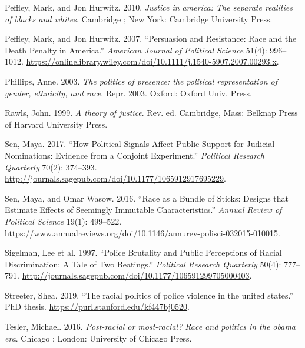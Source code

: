 \documentclass[
  12pt,
]{article}
\newlength{\cslhangindent}
\newlength{\cslentryspacingunit} %
\newenvironment{CSLReferences}[2] %
 {%
  \setlength{\parindent}{0pt}
  \ifodd #1
  \let\oldpar\par
  \def\par{\hangindent=\cslhangindent\oldpar}
  \fi
  \setlength{\parskip}{#2\cslentryspacingunit}
 }%
 {}
\begin{document}
\begin{CSLReferences}{1}{0}
\leavevmode{}%
Peffley, Mark, and Jon Hurwitz. 2010. \emph{Justice in america: The
separate realities of blacks and whites}. Cambridge ; New York:
Cambridge University Press.

\leavevmode{}%
Peffley, Mark, and Jon Hurwitz. 2007. {``Persuasion and Resistance: Race
and the Death Penalty in America.''} \emph{American Journal of Political
Science} 51(4): 996--1012.
\url{https://onlinelibrary.wiley.com/doi/10.1111/j.1540-5907.2007.00293.x}.

\leavevmode{}%
Phillips, Anne. 2003. \emph{The politics of presence: the political
representation of gender, ethnicity, and race}. Repr. 2003. Oxford:
Oxford Univ. Press.

\leavevmode{}%
Rawls, John. 1999. \emph{A theory of justice}. Rev. ed. Cambridge, Mass:
Belknap Press of Harvard University Press.

\leavevmode{}%
Sen, Maya. 2017. {``How Political Signals Affect Public Support for
Judicial Nominations: Evidence from a Conjoint Experiment.''}
\emph{Political Research Quarterly} 70(2): 374--393.
\url{http://journals.sagepub.com/doi/10.1177/1065912917695229}.

\leavevmode{}%
Sen, Maya, and Omar Wasow. 2016. {``Race as a Bundle of Sticks: Designs
that Estimate Effects of Seemingly Immutable Characteristics.''}
\emph{Annual Review of Political Science} 19(1): 499--522.
\url{https://www.annualreviews.org/doi/10.1146/annurev-polisci-032015-010015}.

\leavevmode{}%
Sigelman, Lee et al. 1997. {``Police Brutality and Public Perceptions of
Racial Discrimination: A Tale of Two Beatings.''} \emph{Political
Research Quarterly} 50(4): 777--791.
\url{http://journals.sagepub.com/doi/10.1177/106591299705000403}.

\leavevmode{}%
Streeter, Shea. 2019. {``The racial politics of police violence in the
united states.''} PhD thesis.
\url{https://purl.stanford.edu/kf447bj0520}.

\leavevmode{}%
Tesler, Michael. 2016. \emph{Post-racial or most-racial? Race and
politics in the obama era}. Chicago ; London: University of Chicago
Press.


\end{CSLReferences}
\end{document}
